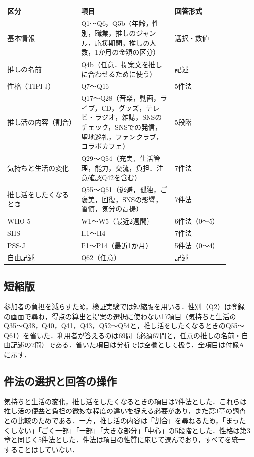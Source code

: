 \begin{table}[t]
\centering
{}
\label{tab:questionnaire}
\small
\begin{tabular}{@{}p{0.3\linewidth}p{0.38\linewidth}p{0.22\linewidth}@{}}
\toprule
区分 & 項目 & 回答形式 \\
\midrule
基本情報 & Q1〜Q6，Q5b（年齢，性別，職業，推しのジャンル，応援期間，推しの人数，1か月の金額の区分） & 選択・数値 \\
推しの名前 & Q4b（任意．提案文を推しに合わせるために使う） & 記述 \\
性格（TIPI-J） & Q7〜Q16 & 5件法 \\
推し活の内容（割合） & Q17〜Q28（音楽，動画，ライブ，CD，グッズ，テレビ・ラジオ，雑誌，SNSのチェック，SNSでの発信，聖地巡礼，ファンクラブ，コラボカフェ） & 5段階 \\
気持ちと生活の変化 & Q29〜Q54（充実，生活管理，能力，交流，負担．注意確認Q42を含む） & 7件法 \\
推し活をしたくなるとき & Q55〜Q61（逃避，孤独，ご褒美，回復，SNSの影響，習慣，気分の高揚） & 7件法 \\
WHO-5 & W1〜W5（最近2週間） & 6件法（0〜5） \\
SHS & H1〜H4 & 7件法 \\
PSS-J & P1〜P14（最近1か月） & 5件法（0〜4） \\
自由記述 & Q62（任意） & 記述 \\
\bottomrule
\end{tabular}
\end{table}

\subsection{短縮版}\label{sec:short}
参加者の負担を減らすため，検証実験では短縮版を用いる．性別（Q2）は登録の画面で尋ね，得点の算出と提案の選択に使わない17項目（気持ちと生活のQ35〜Q38，Q40，Q41，Q43，Q52〜Q54と，推し活をしたくなるときのQ55〜Q61）を省いた．利用者が答えるのは69問（必須67問と，任意の推しの名前・自由記述の2問）である．省いた項目は分析では空欄として扱う．全項目は付録Aに示す．

\subsection{件法の選択と回答の操作}
気持ちと生活の変化，推し活をしたくなるときの項目は7件法とした．これらは推し活の便益と負担の微妙な程度の違いを捉える必要があり，また第3章の調査との比較のためである．一方，推し活の内容は「割合」を尋ねるため，「まったくしない」「ごく一部」「一部」「大きな部分」「中心」の5段階とした．性格は第3章と同じく5件法とした．件法は項目の性質に応じて選んでおり，すべてを統一することはしていない．

